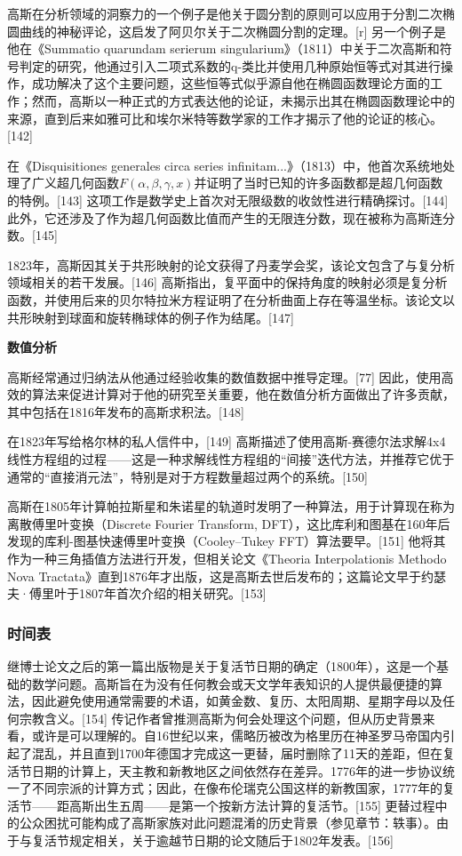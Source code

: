 高斯在分析领域的洞察力的一个例子是他关于圆分割的原则可以应用于分割二次椭圆曲线的神秘评论，这启发了阿贝尔关于二次椭圆分割的定理。[r] 另一个例子是他在《Summatio quarundam serierum singularium》（1811）中关于二次高斯和符号判定的研究，他通过引入二项式系数的q-类比并使用几种原始恒等式对其进行操作，成功解决了这个主要问题，这些恒等式似乎源自他在椭圆函数理论方面的工作；然而，高斯以一种正式的方式表达他的论证，未揭示出其在椭圆函数理论中的来源，直到后来如雅可比和埃尔米特等数学家的工作才揭示了他的论证的核心。[142]

在《Disquisitiones generales circa series infinitam...》（1813）中，他首次系统地处理了广义超几何函数\(F(\alpha, \beta, \gamma, x)\)并证明了当时已知的许多函数都是超几何函数的特例。[143] 这项工作是数学史上首次对无限级数的收敛性进行精确探讨。[144] 此外，它还涉及了作为超几何函数比值而产生的无限连分数，现在被称为高斯连分数。[145]

1823年，高斯因其关于共形映射的论文获得了丹麦学会奖，该论文包含了与复分析领域相关的若干发展。[146] 高斯指出，复平面中的保持角度的映射必须是复分析函数，并使用后来的贝尔特拉米方程证明了在分析曲面上存在等温坐标。该论文以共形映射到球面和旋转椭球体的例子作为结尾。[147]

\textbf{数值分析}  

高斯经常通过归纳法从他通过经验收集的数值数据中推导定理。[77] 因此，使用高效的算法来促进计算对于他的研究至关重要，他在数值分析方面做出了许多贡献，其中包括在1816年发布的高斯求积法。[148]

在1823年写给格尔林的私人信件中，[149] 高斯描述了使用高斯-赛德尔法求解4x4线性方程组的过程——这是一种求解线性方程组的“间接”迭代方法，并推荐它优于通常的“直接消元法”，特别是对于方程数量超过两个的系统。[150]

高斯在1805年计算帕拉斯星和朱诺星的轨道时发明了一种算法，用于计算现在称为离散傅里叶变换（Discrete Fourier Transform, DFT），这比库利和图基在160年后发现的库利-图基快速傅里叶变换（Cooley–Tukey FFT）算法要早。[151] 他将其作为一种三角插值方法进行开发，但相关论文《Theoria Interpolationis Methodo Nova Tractata》直到1876年才出版，这是高斯去世后发布的；这篇论文早于约瑟夫·傅里叶于1807年首次介绍的相关研究。[153]
\subsubsection{时间表}  
继博士论文之后的第一篇出版物是关于复活节日期的确定（1800年），这是一个基础的数学问题。高斯旨在为没有任何教会或天文学年表知识的人提供最便捷的算法，因此避免使用通常需要的术语，如黄金数、复历、太阳周期、星期字母以及任何宗教含义。[154] 传记作者曾推测高斯为何会处理这个问题，但从历史背景来看，或许是可以理解的。自16世纪以来，儒略历被改为格里历在神圣罗马帝国内引起了混乱，并且直到1700年德国才完成这一更替，届时删除了11天的差距，但在复活节日期的计算上，天主教和新教地区之间依然存在差异。1776年的进一步协议统一了不同宗派的计算方式；因此，在像布伦瑞克公国这样的新教国家，1777年的复活节——距高斯出生五周——是第一个按新方法计算的复活节。[155] 更替过程中的公众困扰可能构成了高斯家族对此问题混淆的历史背景（参见章节：轶事）。由于与复活节规定相关，关于逾越节日期的论文随后于1802年发表。[156]
